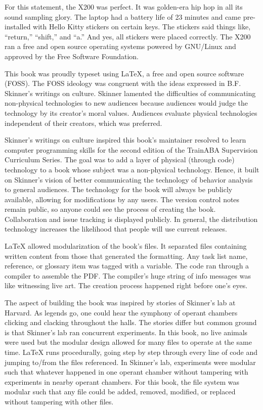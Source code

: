 For this statement, the X200 was perfect. It was golden-era hip hop in all its sound sampling glory. The laptop had a battery life of 23 minutes and came pre-installed with Hello Kitty stickers on certain keys. The stickers said things like, ``return,'' ``shift,'' and ``a.'' And yes, all stickers were placed correctly. The X200 ran a free and open source operating systems powered by GNU/Linux and approved by the Free Software Foundation.

This book was proudly typeset using \LaTeX{}, a free and open source software (FOSS). The FOSS ideology was congruent with the ideas expressed in B.F. Skinner's writings on culture. Skinner lamented the difficulties of communicating non-physical technologies to new audiences because audiences would judge the technology by its creator's moral values. Audiences evaluate physical technologies independent of their creators, which was preferred. 

Skinner's writings on culture inspired this book's maintainer resolved to learn computer programming skills for the second edition of the TrainABA Supervision Curriculum Series. The goal was to add a layer of physical (through code) technology to a book whose subject was a non-physical technology. Hence, it built on Skinner's vision of better communicating the technology of behavior analysis to general audiences. The technology for the book will always be publicly available, allowing for modifications by any users. The version control notes remain public, so anyone could see the process of creating the book. Collaboration and issue tracking is displayed publicly. In general, the distribution technology increases the likelihood that people will use current releases.

\LaTeX{} allowed modularization of the book's files. It separated files containing written content from those that generated the formatting. Any task list name, reference, or glossary item was tagged with a variable. The code ran through a compiler to assemble the PDF. The compiler's huge string of info messages was like witnessing live art. The creation process happened right before one's eyes. 

The aspect of building the book was inspired by stories of Skinner's lab at Harvard. As legends go, one could hear the symphony of operant chambers clicking and clacking throughout the halls. The stories differ but common ground is that Skinner's lab ran concurrent experiments. In this book, no live animals were used but the modular design allowed for many files to operate at the same time. \LaTeX{} runs procedurally, going step by step through every line of code and jumping to/from the files referenced. In Skinner's lab, experiments were modular such that whatever happened in one operant chamber without tampering with experiments in nearby operant chambers. For this book, the file system was modular such that any file could be added, removed, modified, or replaced without tampering with other files.
    
